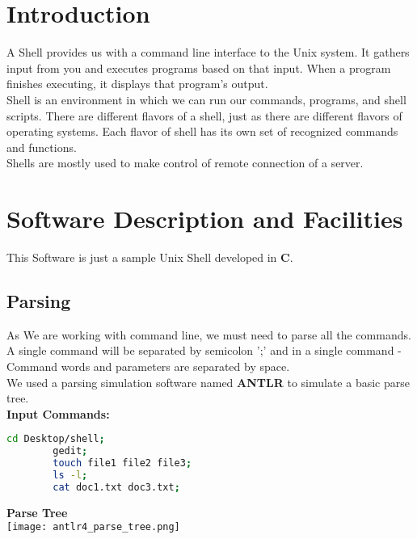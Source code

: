 \documentclass[12pt]{article}
\begin{document}
    \section{Introduction}
    A Shell provides us with a command line interface to the Unix system. It gathers input from you and executes programs based on that input. When a program finishes executing, it displays that program's output.\\
    Shell is an environment in which we can run our commands, programs, and shell scripts. There are different flavors of a shell, just as there are different flavors of operating systems. Each flavor of shell has its own set of recognized commands and functions.\\
    Shells are mostly used to make control of remote connection of a server.

    \section{Software Description and Facilities}
    This Software is just a sample Unix Shell developed in \textbf{C}. 
    \subsection{Parsing}
    As We are working with command line, we must need to parse all the commands. A single command will be separated by semicolon ';' and in a single command - Command words and parameters are separated by space. \\ 
    We used a parsing simulation software named \textbf{ANTLR} to simulate a basic parse tree. 
    \vspace{10mm}\\   %
    \textbf{Input Commands:}
    \begin{lstlisting}[language=bash]
        cd Desktop/shell;
        gedit;
        touch file1 file2 file3;
        ls -l;
        cat doc1.txt doc3.txt;
    \end{lstlisting}
    \vspace{10mm}   %
    \textbf{Parse Tree} \\
    \texttt{[image: antlr4\_parse\_tree.png]}
    
\end{document}
